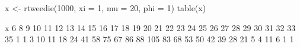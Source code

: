 \begin{Schunk}
\begin{Sinput}
  x <- rtweedie(1000, xi = 1, mu = 20, phi = 1)
  table(x)
\end{Sinput}
\begin{Soutput}
x
  6   8   9  10  11  12  13  14  15  16  17  18  19  20  21  22  23  24  25  26  27  28  29  30  31  32  33  35 
  1   1   3  10  11  18  24  41  58  75  67  86  88 105  83  68  53  50  42  39  28  21   5   4  11   6   1   1 
\end{Soutput}
\end{Schunk}
